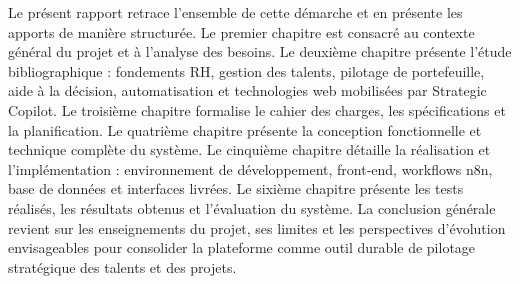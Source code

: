 Le présent rapport retrace l'ensemble de cette démarche et en présente les apports de manière structurée. Le premier chapitre est consacré au contexte général du projet et à l'analyse des besoins. Le deuxième chapitre présente l'étude bibliographique : fondements RH, gestion des talents, pilotage de portefeuille, aide à la décision, automatisation et technologies web mobilisées par Strategic Copilot. Le troisième chapitre formalise le cahier des charges, les spécifications et la planification. Le quatrième chapitre présente la conception fonctionnelle et technique complète du système. Le cinquième chapitre détaille la réalisation et l'implémentation : environnement de développement, front-end, workflows n8n, base de données et interfaces livrées. Le sixième chapitre présente les tests réalisés, les résultats obtenus et l'évaluation du système. La conclusion générale revient sur les enseignements du projet, ses limites et les perspectives d'évolution envisageables pour consolider la plateforme comme outil durable de pilotage stratégique des talents et des projets.

